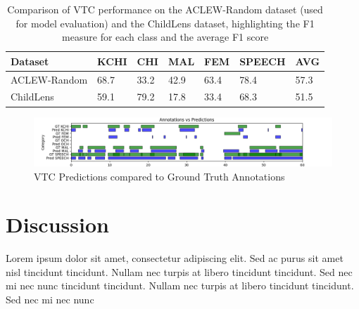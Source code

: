 \documentclass[
  man,floatsintext]{apa6}
\begin{document}
\begin{table}[tbp]

\begin{center}
\begin{threeparttable}

\caption{\label{tab:vtc-results}Comparison of VTC performance on the ACLEW-Random dataset (used for model evaluation) and the ChildLens dataset, highlighting the F1  measure for each class and the average F1 score}

\begin{tabular}{lllllll}
\toprule
Dataset & \multicolumn{1}{c}{KCHI} & \multicolumn{1}{c}{CHI} & \multicolumn{1}{c}{MAL} & \multicolumn{1}{c}{FEM} & \multicolumn{1}{c}{SPEECH} & \multicolumn{1}{c}{AVG}\\
\midrule
ACLEW-Random & 68.7 & 33.2 & 42.9 & 63.4 & 78.4 & 57.3\\
ChildLens & 59.1 & 79.2 & 17.8 & 33.4 & 68.3 & 51.5\\
\bottomrule
\end{tabular}

\end{threeparttable}
\end{center}

\end{table}

\begin{figure}

{\centering \includegraphics[width=6.67in]{images/vtc_performance_evaluation} 

}

\caption{VTC Predictions compared to Ground Truth Annotations}\label{fig:vtc-evaluations}
\end{figure}

\section{Discussion}\label{discussion}

Lorem ipsum dolor sit amet, consectetur adipiscing elit. Sed ac purus sit amet nisl tincidunt tincidunt. Nullam nec turpis at libero tincidunt tincidunt. Sed nec mi nec nunc tincidunt tincidunt. Nullam nec turpis at libero tincidunt tincidunt. Sed nec mi nec nunc
\end{document}

